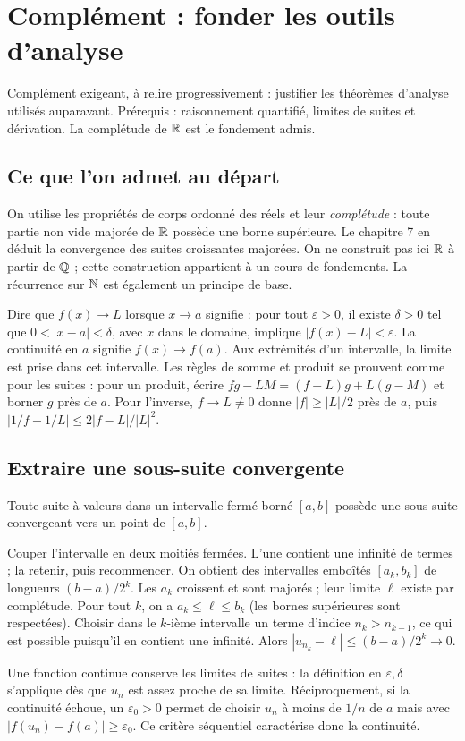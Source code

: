 \documentclass[../cours_1re.tex]{subfiles}
\begin{document}
\setcounter{chapter}{24}
\chapter{Complément : fonder les outils d'analyse}
\label{ch:25}
\begin{objectif}
Complément exigeant, à relire progressivement : justifier les théorèmes d'analyse utilisés auparavant.
Prérequis : raisonnement quantifié, limites de suites et dérivation. La complétude de $\mathbb{R}$ est le fondement admis.
\end{objectif}
\section{Ce que l'on admet au départ}
On utilise les propriétés de corps ordonné des réels et leur
\emph{complétude} : toute partie non vide majorée de $\mathbb{R}$ possède une borne
supérieure. Le chapitre 7 en déduit la convergence des suites croissantes majorées.
On ne construit pas ici $\mathbb{R}$ à partir de $\mathbb{Q}$ ; cette construction appartient
à un cours de fondements. La récurrence sur $\mathbb{N}$ est également un principe de base.

Dire que $f(x)\to L$ lorsque $x\to a$ signifie :
pour tout $\varepsilon>0$, il existe $\delta>0$ tel que
$0<|x-a|<\delta$, avec $x$ dans le domaine, implique $|f(x)-L|<\varepsilon$.
La continuité en $a$ signifie $f(x)\to f(a)$. Aux extrémités d'un intervalle,
la limite est prise dans cet intervalle.
Les règles de somme et produit se prouvent comme pour les suites :
pour un produit, écrire
$fg-LM=(f-L)g+L(g-M)$ et borner $g$ près de $a$.
Pour l'inverse, $f\to L\ne0$ donne $|f|\ge|L|/2$ près de $a$, puis
$|1/f-1/L|\le2|f-L|/|L|^2$.

\section{Extraire une sous-suite convergente}
\begin{theoreme}
Toute suite à valeurs dans un intervalle fermé borné $[a,b]$
possède une sous-suite convergeant vers un point de $[a,b]$.
\end{theoreme}
\begin{demonstration}
Couper l'intervalle en deux moitiés fermées. L'une contient une infinité
de termes ; la retenir, puis recommencer. On obtient des intervalles emboîtés
$[a_k,b_k]$ de longueurs $(b-a)/2^k$. Les $a_k$ croissent et sont majorés ;
leur limite $\ell$ existe par complétude. Pour tout $k$, on a
$a_k\le\ell\le b_k$ (les bornes supérieures sont respectées).
Choisir dans le $k$-ième intervalle un terme d'indice $n_k>n_{k-1}$,
ce qui est possible puisqu'il en contient une infinité.
Alors $|u_{n_k}-\ell|\le(b-a)/2^k\to0$.
\end{demonstration}
Une fonction continue conserve les limites de suites :
la définition en $\varepsilon,\delta$ s'applique dès que $u_n$ est assez
proche de sa limite. Réciproquement, si la continuité échoue, un
$\varepsilon_0>0$ permet de choisir $u_n$ à moins de $1/n$ de $a$
mais avec $|f(u_n)-f(a)|\ge\varepsilon_0$.
Ce critère séquentiel caractérise donc la continuité.
\end{document}
